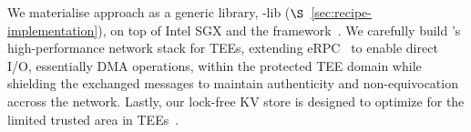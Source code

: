 

We materialise \projecttitle{} approach as a generic library, \projecttitle{}-lib ($\S$~\ref{sec:recipe-implementation}), on top of Intel SGX and the \scone{} framework~\cite{arnautov2016scone}. We carefully build \projecttitle{}'s high-performance network stack for TEEs, extending eRPC~\cite{erpc} to enable direct I/O, essentially DMA operations, within the protected TEE domain while shielding the exchanged messages to maintain authenticity and non-equivocation accross the network. Lastly, our lock-free KV store is designed to optimize for the limited trusted area in TEEs~\cite{speicher-fast, shieldstore}.%



